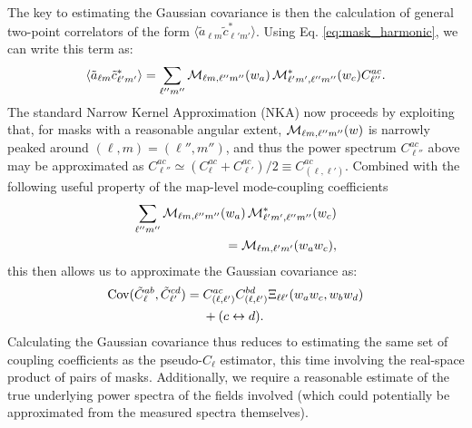 \documentclass[%
 reprint,
superscriptaddress,
nofootinbib,
 amsmath,amssymb,
 aps,
 prd,
]{revtex4-2}
\begin{document}
    The key to estimating the Gaussian covariance is then the calculation of general two-point correlators of the form $\langle\tilde{a}_{\ell m}\tilde{c}_{\ell'm'}^*\rangle$. Using Eq. \ref{eq:mask_harmonic}, we can write this term as:
    \begin{equation}\label{eq:general_2pt}
      \langle\tilde{a}_{\ell m}\tilde{c}_{\ell'm'}^*\rangle=
      \sum_{\ell''m''}{\cal M}_{\ell m,\ell''m''}(w_a)\,{\cal M}^{*}_{\ell' m',\ell''m''}(w_c)C_{\ell''}^{ac}.
    \end{equation}
    The standard Narrow Kernel Approximation (NKA) now proceeds by exploiting that, for masks with a reasonable angular extent, ${\cal M}_{\ell m,\ell''m''}(w)$ is narrowly peaked around $(\ell,m)=(\ell'',m'')$, and thus the power spectrum $C^{ac}_{\ell''}$ above may be approximated as $C^{ac}_{\ell''}\simeq(C^{ac}_\ell+C^{ac}_{\ell'})/2\equiv C^{ac}_{(\ell,\ell')}$. Combined with the following useful property of the map-level mode-coupling coefficients
    \begin{align}
      \sum_{\ell''m''}{\cal M}_{\ell m,\ell''m''}(w_a)\,{\cal M}^{*}_{\ell' m',\ell''m''}(w_c) \notag \\ ={\cal M}_{\ell m,\ell'm'}(w_aw_c),
    \end{align}
    this then allows us to approximate the Gaussian covariance as:
    \begin{align}\nonumber
      {\rm Cov}(\tilde{C}^{ab}_\ell,\tilde{C}^{cd}_{\ell'})= \;
      &C^{ac}_{(\ell,\ell')}C^{bd}_{(\ell,\ell')}\Xi_{\ell\ell'}(w_aw_c,w_bw_d)\\\label{eq:nka_simple}
      &+(c\leftrightarrow d).
    \end{align}
    Calculating the Gaussian covariance thus reduces to estimating the same set of coupling coefficients as the pseudo-$C_\ell$ estimator, this time involving the real-space product of pairs of masks. Additionally, we require a reasonable estimate of the true underlying power spectra of the fields involved (which could potentially be approximated from the measured spectra themselves).
\end{document}
